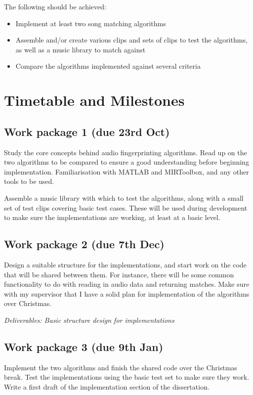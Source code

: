 \documentclass[12pt]{article}
\begin{document}
The following should be achieved:

\begin{itemize}

\item Implement at least two song matching algorithms

\item Assemble and/or create various clips and sets of clips to test the algorithms, as well as a music library to match against

\item Compare the algorithms implemented against several criteria

\end{itemize}


\newpage %

\section*{Timetable and Milestones}

\subsection*{Work package 1 (due 23rd Oct)}
Study the core concepts behind audio fingerprinting algorithms. Read up on the two algorithms to be compared to ensure a good understanding before beginning implementation. Familiarisation with MATLAB and MIRToolbox, and any other tools to be used.

Assemble a music library with which to test the algorithms, along with a small set of test clips covering basic test cases. These will be used during development to make sure the implementations are working, at least at a basic level.

\subsection*{Work package 2 (due 7th Dec)}
Design a suitable structure for the implementations, and start work on the code that will be shared between them. For instance, there will be some common functionality to do with reading in audio data and returning matches. Make sure with my supervisor that I have a solid plan for implementation of the algorithms over Christmas.

\emph{Deliverables: Basic structure design for implementations}

\subsection*{Work package 3 (due 9th Jan)}
Implement the two algorithms and finish the shared code over the Christmas break. Test the implementations using the basic test set to make sure they work. Write a first draft of the implementation section of the dissertation.
\end{document}
